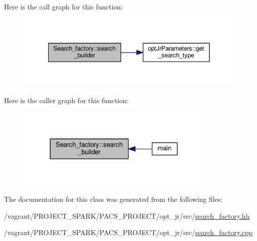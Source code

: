Here is the call graph for this function\-:\nopagebreak
\begin{figure}[H]
\begin{center}
\leavevmode
\includegraphics[width=342pt]{classSearch__factory_a47fca32f216bd67232f9ea82416a32d4_cgraph}
\end{center}
\end{figure}




Here is the caller graph for this function\-:\nopagebreak
\begin{figure}[H]
\begin{center}
\leavevmode
\includegraphics[width=272pt]{classSearch__factory_a47fca32f216bd67232f9ea82416a32d4_icgraph}
\end{center}
\end{figure}




The documentation for this class was generated from the following files\-:\begin{DoxyCompactItemize}
\item 
/vagrant/\-P\-R\-O\-J\-E\-C\-T\-\_\-\-S\-P\-A\-R\-K/\-P\-A\-C\-S\-\_\-\-P\-R\-O\-J\-E\-C\-T/opt\-\_\-jr/src/\hyperlink{search__factory_8hh}{search\-\_\-factory.\-hh}\item 
/vagrant/\-P\-R\-O\-J\-E\-C\-T\-\_\-\-S\-P\-A\-R\-K/\-P\-A\-C\-S\-\_\-\-P\-R\-O\-J\-E\-C\-T/opt\-\_\-jr/src/\hyperlink{search__factory_8cpp}{search\-\_\-factory.\-cpp}\end{DoxyCompactItemize}
